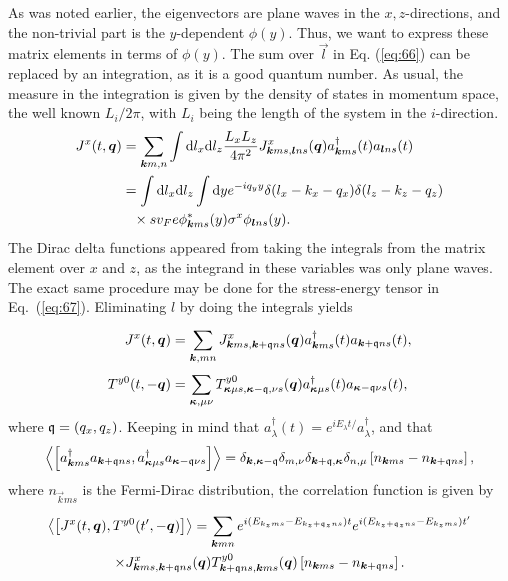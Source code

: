 As was noted earlier, the eigenvectors are plane waves in the $x, z$-directions, and the non-trivial part is the $y$-dependent $\phi (y)$.
Thus, we want to express these matrix elements in terms of $\phi (y)$.
The sum over $\vec{l}$ in Eq. (\ref{eq:66}) can be replaced by an integration, as it is a good quantum number.
As usual, the measure in the integration is given by the density of states in momentum space, the well known $L_{i} /2\pi $, with $L_i$ being the length of the system in the $i$-direction.
\begin{align}
  J^x(t, \vec{q}) &= \sum\limits_{\vec{k}m, n}^{} \int \mathrm{d}l_x \mathrm{d}l_z \frac{L_xL_z}{4 \pi ^2}
                    J^x_{\vec{k}ms, \vec{l}ns} (\vec{q}) a^{\dagger}_{\vec{k} ms} (t) a_{\vec{l} ns}(t)\\
  \nonumber &= \int \mathrm{d}l_x \mathrm{d} l_{z} \int \mathrm{d} y e^{-i q_y y}
                    \delta (l_x - k_x - q_x) \delta (l_z - k_z -  q_z)\\
                    \nonumber &\pe \times sv_F e \phi ^{*}_{\vec{k} ms}(y) \sigma ^x \phi _{\vec{l}ns}(y).
\end{align}
The Dirac delta functions appeared from taking the integrals from the matrix element over $x$ and $z$, as the integrand in these variables was only plane waves.
The exact same procedure may be done for the stress-energy tensor in Eq.~(\ref{eq:67}).
Eliminating $l$ by doing the integrals yields
\begin{align}
  J^x(t, \bm{q}) &= \sum\limits_{\bm{k}, mn}^{}
                    J^x_{\bm{k}ms, \bm{k}+\mathfrak{q} ns}(\bm{q}) a^{\dagger}_{\bm{k} ms}(t) a_{\bm{k}+\mathfrak{q} ns}(t),\\
  T^{y 0}(t, -\bm{q}) &= \sum\limits_{\bm{\kappa}, \mu  \nu }^{} T^{y 0}_{\bm{\kappa } \mu  s, \bm{\kappa } - \mathfrak{q}, \nu  s}(\bm{q}) a^{\dagger}_{\bm{\kappa } \mu   s}(t) a_{\bm{\kappa } - \mathfrak{q} \nu  s}(t),
\end{align}
where ${\mathfrak{q}} = (q_x, q_z)$.
Keeping in mind that $a_{\lambda }^{\dagger} (t) = e^{i E_{\lambda } t /  }a_{\lambda }^{\dagger}$, and that
\begin{equation}
  \Braket{\left[
a^{\dagger}_{\bm{k}ms} a_{\bm{k}+\mathfrak{q} ns}, a^{\dagger}_{\bm{\kappa}\mu s} a_{\bm{\kappa}-\mathfrak{q} \nu  s}
\right]}
=
\delta_{\bm{k}, \bm{\kappa}-\mathfrak{q}}
\delta _{m, \nu }
\delta _{\bm{k}+\mathfrak{q}, \bm{\kappa}}
\delta _{n, \mu }
\left[ n_{\bm{k}ms}- n_{\bm{k}+\mathfrak{q} ns} \right],
\end{equation}
where \( n_{\vec{k} m s} \) is the Fermi-Dirac distribution, the correlation function is given by
\begin{multline}
  \Braket{\left[ J^x(t, \bm{q}), T^{y 0}(t', -\bm{q}) \right]}
  =
  \sum\limits_{\bm{k} mn}^{}
  e^{i( E_{k_zms} - E_{k_z+\mathfrak{q}_z ns} )t}
  e^{i( E_{k_z+\mathfrak{q}_z ns} - E_{k_z ms} ) t'}\\
  \times
  J^x_{\bm{k}ms, \bm{k}+\mathfrak{q}ns}(\bm{q})
  T^{y 0}_{\bm{k}+\mathfrak{q}ns, \bm{k}ms}(\bm{q})
  \left[ n_{\bm{k}ms}- n_{\bm{k}+\mathfrak{q} ns} \right].
\end{multline}

